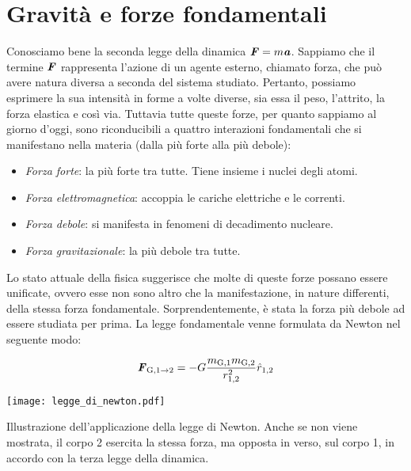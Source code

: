 \marginpar{\minitoc}

\section{Gravità e forze fondamentali}
Conosciamo bene la seconda legge della dinamica $\textbf{\textit{F}} = m\textbf{\textit{a}}$.
Sappiamo che il termine $\textbf{\textit{F}}$ rappresenta l'azione di un agente esterno,
chiamato forza, che può avere natura diversa a seconda del sistema studiato.
Pertanto, possiamo esprimere
la sua intensità in forme a volte diverse, sia essa il peso, l'attrito, la
forza elastica e così via. Tuttavia tutte queste forze, per quanto sappiamo al
giorno d'oggi, sono riconducibili a quattro interazioni fondamentali che si
manifestano nella materia (dalla più forte alla più debole):
\begin{itemize}
    \item \textit{Forza forte}: la più forte tra tutte. Tiene insieme i nuclei
    degli atomi.

    \item \textit{Forza elettromagnetica}: accoppia le cariche elettriche e
    le correnti.

    \item \textit{Forza debole}: si manifesta in fenomeni di decadimento nucleare.
    
    \item \textit{Forza gravitazionale}: la più debole tra tutte.
\end{itemize}
Lo stato attuale della fisica suggerisce che molte di queste forze possano essere
unificate, ovvero esse non sono altro che la manifestazione, in nature differenti,
della stessa forza fondamentale.
Sorprendentemente, è stata la forza più debole ad essere studiata per prima.
La legge fondamentale venne formulata da Newton nel seguente modo:

\vspace{8pt}
\begin{tcolorbox}[colback = yellow!30, colframe = yellow!30!black, title = {Legge di gravitazione universale}]
    \begin{align}
        \textbf{\textit{F}}_{\text{G}, 1\to 2} = -G\frac{m_{\text{G},1}m_{\text{G},2}}{r^2_{1,2}}\hat{r}_{1,2}\label{gravity}
    \end{align}    
\end{tcolorbox}
\vspace{5pt}

\begin{marginfigure}
    \centering
    \texttt{[image: legge\_di\_newton.pdf]}
    \caption{Illustrazione dell'applicazione della legge di Newton.
    Anche se non viene mostrata, il corpo 2 esercita la stessa
    forza, ma opposta in verso, sul corpo 1, in accordo con la
    terza legge della dinamica.}
    \label{gravitescionalfors}
\end{marginfigure}

